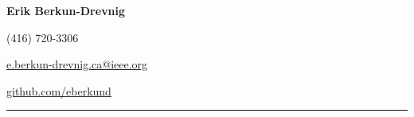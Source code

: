 \noindent
\begin{minipage}[b]{0.6\textwidth}
\Huge\textbf{Erik Berkun-Drevnig}
\end{minipage}
\begin{minipage}[b]{0.4\textwidth}
\begin{flushright}%
(416) 720-3306\par
\href{mailto:e.berkun-drevnig.ca@ieee.org}{e.berkun-drevnig.ca@ieee.org}\par
\href{https://github.com/eberkund}{github.com/eberkund}\par
\end{flushright}
\end{minipage}
\smallskip
\hrule
